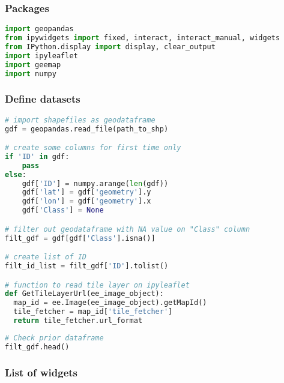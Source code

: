 \hypertarget{packages-1}{%
\subsubsection{Packages}\label{packages-1}}

\begin{lstlisting}[language=Python]
import geopandas
from ipywidgets import fixed, interact, interact_manual, widgets
from IPython.display import display, clear_output
import ipyleaflet
import geemap
import numpy
\end{lstlisting}

\hypertarget{define-datasets-1}{%
\subsubsection{Define datasets}\label{define-datasets-1}}

\begin{lstlisting}[language=Python]
# import shapefiles as geodataframe
gdf = geopandas.read_file(path_to_shp)

# create some columns for first time only
if 'ID' in gdf:
    pass
else:
    gdf['ID'] = numpy.arange(len(gdf))
    gdf['lat'] = gdf['geometry'].y
    gdf['lon'] = gdf['geometry'].x
    gdf['Class'] = None

# filter out geodataframe with NA value on "Class" column
filt_gdf = gdf[gdf['Class'].isna()]

# create list of ID
filt_id_list = filt_gdf['ID'].tolist()

# function to read tile layer on ipyleaflet
def GetTileLayerUrl(ee_image_object):
  map_id = ee.Image(ee_image_object).getMapId()
  tile_fetcher = map_id['tile_fetcher']
  return tile_fetcher.url_format
\end{lstlisting}

\begin{lstlisting}[language=Python]
# Check prior dataframe
filt_gdf.head()
\end{lstlisting}

\hypertarget{list-of-widgets}{%
\subsubsection{List of widgets}\label{list-of-widgets}}

